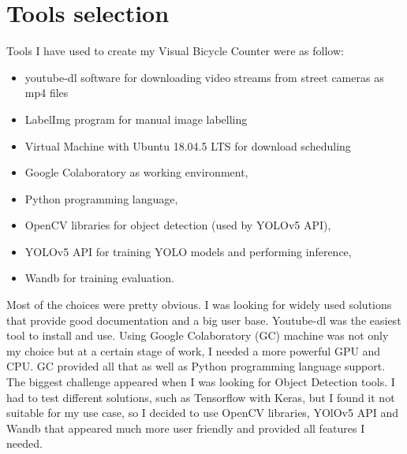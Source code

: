 \section{Tools selection}
\label{sec:tools}

Tools I have used to create my Visual Bicycle Counter were as follow:
\begin{itemize}
    \item youtube-dl software for downloading video streams from street cameras as mp4 files
    \item LabelImg program for manual image labelling 
    \item Virtual Machine with Ubuntu 18.04.5 LTS for download scheduling 
    \item Google Colaboratory as working environment,
    \item Python programming language,
    \item OpenCV libraries for object detection (used by YOLOv5 API),
    \item YOLOv5 API for training YOLO\cite{Redmon_2016_CVPR} models and performing inference,
    \item Wandb for training evaluation.
\end{itemize}
Most of the choices were pretty obvious. I was looking for widely used solutions that provide good documentation and a big user base. Youtube-dl was the easiest tool to install and use. Using Google Colaboratory (GC) machine was not only my choice but at a certain stage of work, I needed a more powerful GPU and CPU. GC provided all that as well as Python programming language support. The biggest challenge appeared when I was looking for Object Detection tools. I had to test different solutions, such as Tensorflow with Keras, but I found it not suitable for my use case, so I decided to use OpenCV libraries, YOlOv5 API and Wandb that appeared much more user friendly and provided all features I needed.
